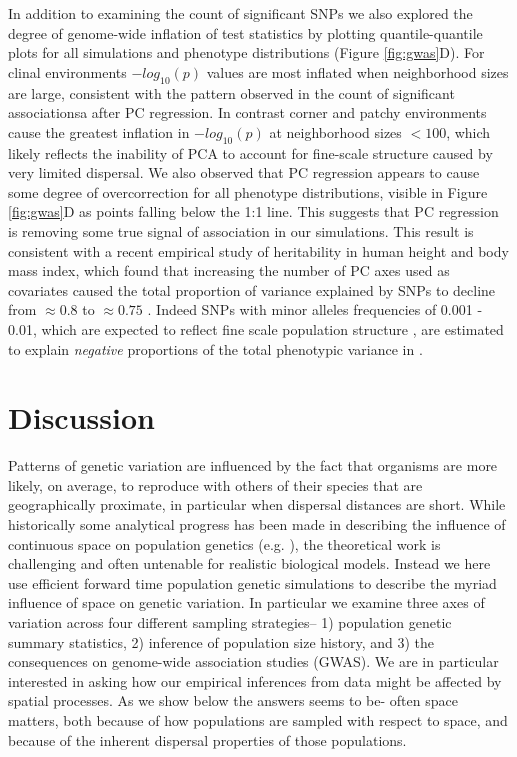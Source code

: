\documentclass[10pt,twoside,lineno]{gsajnl}
\begin{document}
In addition to examining the count of significant SNPs we also explored the degree of genome-wide inflation of test statistics by plotting quantile-quantile plots for all simulations and phenotype distributions (Figure \ref{fig:gwas}D). For clinal environments $-log_{10}(p)$ values are most inflated when neighborhood sizes are large, consistent with the pattern observed in the count of significant associationsa after PC regression. In contrast corner and patchy environments cause the greatest inflation in $-log_{10}(p)$ at neighborhood sizes $<100$, which likely reflects the inability of PCA to account for fine-scale structure caused by very limited dispersal. We also observed that PC regression appears to cause some degree of overcorrection for all phenotype distributions, visible in Figure \ref{fig:gwas}D as points falling below the 1:1 line. This suggests that PC regression is removing some true signal of association in our simulations. This result is consistent with a recent empirical study of heritability in human height and body mass index, which found that increasing the number of PC axes used as covariates caused the total proportion of variance explained by SNPs to decline from $\approx0.8$ to $\approx0.75$ \citep{Wainschtein2019}. Indeed SNPs with minor alleles frequencies of 0.001 - 0.01, which are expected to reflect fine scale population structure \citep{Mathieson2012,Novembre2009}, are estimated to explain \textit{negative} proportions of the total phenotypic variance in \citep{Wainschtein2019}.

\section{Discussion}

Patterns of genetic variation are influenced by the fact that organisms are more likely, on average, to reproduce with others of their species that are geographically proximate, in particular when dispersal distances are short. While historically some analytical progress has been made in describing the influence of continuous space on population genetics (e.g. \cite{Wright1943,Rousset1997}), the theoretical work is challenging and often untenable for realistic biological models. Instead we here use efficient forward time population genetic simulations to describe the myriad influence of space on genetic variation. In particular we examine three axes of variation across four different sampling strategies-- 1) population genetic summary statistics, 2) inference of population size history, and 3) the consequences on genome-wide association studies (GWAS). We are in particular interested in asking how our empirical inferences from data might be affected by spatial processes. As we show below the answers seems to be- often space matters, both because of how populations are sampled with respect to space, and because of the inherent dispersal properties of those populations. 
\end{document}
